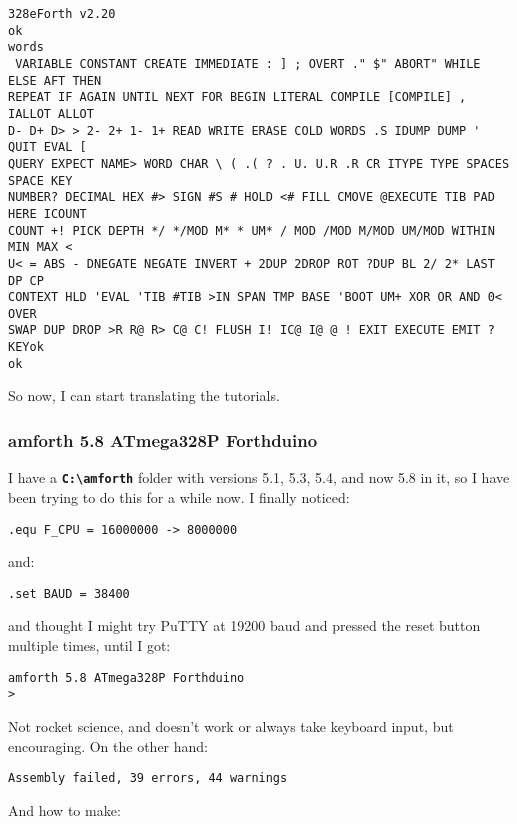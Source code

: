 \documentclass[10pt,english]{article}
\begin{document}
\begin{lstlisting}
328eForth v2.20
ok
words
 VARIABLE CONSTANT CREATE IMMEDIATE : ] ; OVERT ." $" ABORT" WHILE ELSE AFT THEN 
REPEAT IF AGAIN UNTIL NEXT FOR BEGIN LITERAL COMPILE [COMPILE] , IALLOT ALLOT 
D- D+ D> > 2- 2+ 1- 1+ READ WRITE ERASE COLD WORDS .S IDUMP DUMP ' QUIT EVAL [ 
QUERY EXPECT NAME> WORD CHAR \ ( .( ? . U. U.R .R CR ITYPE TYPE SPACES SPACE KEY 
NUMBER? DECIMAL HEX #> SIGN #S # HOLD <# FILL CMOVE @EXECUTE TIB PAD HERE ICOUNT 
COUNT +! PICK DEPTH */ */MOD M* * UM* / MOD /MOD M/MOD UM/MOD WITHIN MIN MAX < 
U< = ABS - DNEGATE NEGATE INVERT + 2DUP 2DROP ROT ?DUP BL 2/ 2* LAST DP CP 
CONTEXT HLD 'EVAL 'TIB #TIB >IN SPAN TMP BASE 'BOOT UM+ XOR OR AND 0< OVER 
SWAP DUP DROP >R R@ R> C@ C! FLUSH I! IC@ I@ @ ! EXIT EXECUTE EMIT ?KEYok 
ok
\end{lstlisting}


So now, I can start translating the tutorials.


\subsubsection{amforth 5.8 ATmega328P Forthduino}

I have a \texttt{\textbf{C:\textbackslash{}amforth}} folder with versions
5.1, 5.3, 5.4, and now 5.8 in it, so I have been trying to do this
for a while now. I finally noticed:

\begin{lstlisting}
.equ F_CPU = 16000000 -> 8000000
\end{lstlisting}


and:

\begin{lstlisting}
.set BAUD = 38400 
\end{lstlisting}


and thought I might try PuTTY at 19200 baud and pressed the reset
button multiple times, until I got:

\begin{lstlisting}
amforth 5.8 ATmega328P Forthduino
> 
\end{lstlisting}


Not rocket science, and doesn't work or always take keyboard input,
but encouraging. On the other hand:

\begin{lstlisting}
Assembly failed, 39 errors, 44 warnings
\end{lstlisting}


And how to make:
\end{document}
